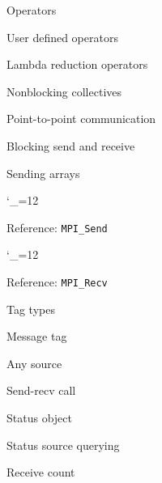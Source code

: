 \documentclass[11pt,headernav]{beamer}
\newcommand\referenceframe{\begingroup\catcode`\_=12 \referenceframett}
\gdef\referenceframett#1{
  \begin{numberedframe}{Reference: \texttt{MPI_#1}}
    \small
    
  \end{numberedframe}\endgroup}
\begin{document}
\begin{exerciseframe}[scangather]
  
\end{exerciseframe}
\begin{exerciseframe}[scangather]
  
\end{exerciseframe}

\begin{numberedframe}{Operators}
  
\end{numberedframe}
\begin{numberedframe}{User defined operators}
  
\end{numberedframe}
\begin{numberedframe}{Lambda reduction operators}
  
\end{numberedframe}
\begin{numberedframe}{Nonblocking collectives}
  
\end{numberedframe}

 {Point-to-point communication}

\begin{numberedframe}{Blocking send and receive}
  
\end{numberedframe}
\begin{numberedframe}{Sending arrays}
  
\end{numberedframe}
\referenceframe{Send}
\referenceframe{Recv}
\begin{numberedframe}{Tag types}
  
\end{numberedframe}
\begin{numberedframe}{Message tag}
  
\end{numberedframe}
\begin{numberedframe}{Any source}
  
\end{numberedframe}
\begin{numberedframe}{Send-recv call}
  
\end{numberedframe}
\begin{numberedframe}{Status object}
  
\end{numberedframe}
\begin{numberedframe}{Status source querying}
  
\end{numberedframe}
\begin{numberedframe}{Receive count}
  
\end{numberedframe}
\end{document}
